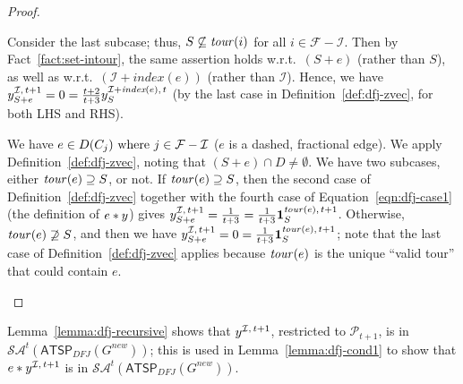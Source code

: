 \documentclass[11pt]{article}
\newcommand{\pop}{\mathcal{P}}
\newcommand{\atspdfj}{\homog{\textsf{ATSP$_{\mathit{DFJ}}$}}}
\newcommand{\fracset}{\mathcal{F}}
\newcommand{\sgn}{\mathcal{I}}
\newcommand{\onevec}[2]{\textbf{1}^{#1,\,#2}}		\newcommand{\goodfrac}[2]{F^{#1}(#2)}	\newcommand{\szgoodfrac}[2]{f^{#1}(#2)}	\newcommand{\cindex}[1]{\textit{index}(#1)} \newcommand{\indfrac}{h}	\newcommand{\tour}{\textit{tour\/}}
\newcommand{\saop}{\mathcal{SA}}
\newcommand{\homog}[1]{{#1}}
\begin{document}
\begin{proof}
\begin{description}
{\begin{description}
{\begin{description}
{\item[Subcase~3.2.2.]
Consider the last subcase;
thus, $S\not\subseteq\tour(i)$ for all $i\in\fracset-\sgn$.
Then by Fact~\ref{fact:set-intour}, the same assertion
holds w.r.t.\ $(S+e)$ (rather than $S$),
as well as w.r.t.\ $(\sgn+\cindex{e})$ (rather than $\sgn$).
Hence, we have
$\zvec{\sgn}{t+1}_{S+e} = 0 = \frac{t+2}{t+3} \zvec{\sgn+\cindex{e}}{t}_S$
(by the last case in Definition~\ref{def:dfj-zvec},
for both LHS and RHS).
}\end{description}
} \end{description}

\item[Case~4.]
We have
$e\in D(C_j) \textup{~where~} j\in \fracset-\sgn$
{($e$ is a dashed, fractional edge)}.
We apply Definition~\ref{def:dfj-zvec}, noting that
$(S+e)\cap D\not=\emptyset$.
We have two subcases, either
$\tour(e)\supseteq{S}$, or not.
If $\tour(e)\supseteq{S}$, then the second case of
Definition~\ref{def:dfj-zvec}
together with the fourth case of Equation~\eqref{eqn:dfj-case1}
(the definition of $e*y$) gives
$\zvec{\sgn}{t+1}_{S+e} = \frac{1}{t+3} =
	\frac{1}{t+3} \onevec{\tour(e)}{t+1}_S$.
Otherwise, $\tour(e)\not\supseteq{S}$, and then we have
$\zvec{\sgn}{t+1}_{S+e} = 0 =
	\frac{1}{t+3} \onevec{\tour(e)}{t+1}_S$;
note that the last case of Definition~\ref{def:dfj-zvec}
applies because $\tour(e)$ is
the unique ``valid tour'' that could contain $e$.
}\end{description}
\end{proof}


Lemma~\ref{lemma:dfj-recursive} shows that $\zvec{\sgn}{t+1}$,
restricted to $\pop_{t+1}$,
is in $\saop^t(\atspdfj(G^{new}))$;
this is used in Lemma~\ref{lemma:dfj-cond1} to show that $e * \zvec{\sgn}{t+1}$
is in $\saop^t(\atspdfj(G^{new}))$.
\end{document}
